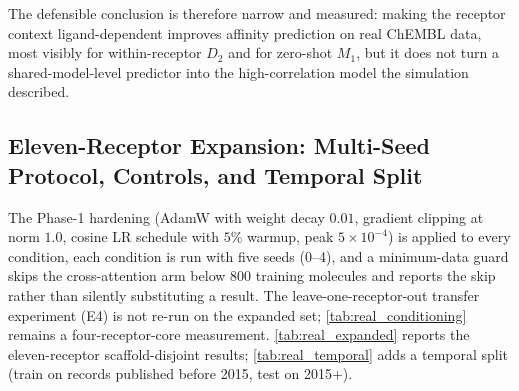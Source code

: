 The defensible conclusion is therefore narrow and measured: making the receptor context ligand-dependent improves affinity prediction on real ChEMBL data, most visibly for within-receptor $D_2$ and for zero-shot $M_1$, but it does not turn a shared-model-level predictor into the high-correlation model the simulation described.

\subsection{Eleven-Receptor Expansion: Multi-Seed Protocol, Controls, and Temporal Split}
\label{sec:expanded}

The Phase-1 hardening (AdamW with weight decay $0.01$, gradient clipping at norm $1.0$, cosine LR schedule with $5\%$ warmup, peak $5 \times 10^{-4}$) is applied to every condition, each condition is run with five seeds (0--4), and a minimum-data guard skips the cross-attention arm below $800$ training molecules and reports the skip rather than silently substituting a result. The leave-one-receptor-out transfer experiment (E4) is not re-run on the expanded set; \cref{tab:real_conditioning} remains a four-receptor-core measurement. \cref{tab:real_expanded} reports the eleven-receptor scaffold-disjoint results; \cref{tab:real_temporal} adds a temporal split (train on records published before 2015, test on 2015+).

